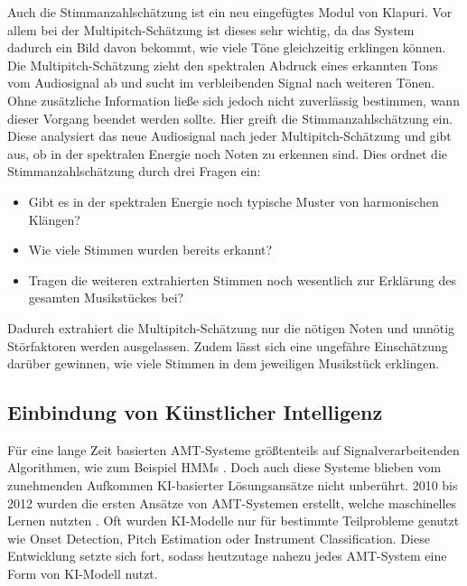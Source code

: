 \begin{description}[style=nextline]
\item[Multipitch-Schätzung]\label{itm:multi}
Auch die Stimmanzahlschätzung ist ein neu eingefügtes Modul von Klapuri.
Vor allem bei der Multipitch-Schätzung ist dieses sehr wichtig, da das System dadurch ein Bild davon bekommt,
wie viele Töne gleichzeitig erklingen können.
Die Multipitch-Schätzung zieht den spektralen Abdruck eines erkannten Tons vom Audiosignal ab und sucht im verbleibenden Signal nach weiteren Tönen.
Ohne zusätzliche Information ließe sich jedoch nicht zuverlässig bestimmen, wann dieser Vorgang beendet werden sollte.
Hier greift die Stimmanzahlschätzung ein.
Diese analysiert das neue Audiosignal nach jeder Multipitch-Schätzung und gibt aus,
ob in der spektralen Energie noch Noten zu erkennen sind.
Dies ordnet die Stimmanzahlschätzung durch drei Fragen ein:
\begin{itemize}
    \item Gibt es in der spektralen Energie noch typische Muster von harmonischen Klängen?
    \item Wie viele Stimmen wurden bereits erkannt?
    \item Tragen die weiteren extrahierten Stimmen noch wesentlich zur Erklärung des gesamten Musikstückes bei?
\end{itemize}
Dadurch extrahiert die Multipitch-Schätzung nur die nötigen Noten und unnötig Störfaktoren werden ausgelassen.
Zudem lässt sich eine ungefähre Einschätzung darüber gewinnen, wie viele Stimmen in dem jeweiligen Musikstück erklingen.
\end{description}

\subsection{Einbindung von Künstlicher Intelligenz}
Für eine lange Zeit basierten AMT-Systeme größtenteils auf Signalverarbeitenden Algorithmen,
wie zum Beispiel HMMs .
Doch auch diese Systeme blieben vom zunehmenden Aufkommen KI-basierter Lösungsansätze nicht unberührt.
2010 bis 2012 wurden die ersten Ansätze von AMT-Systemen erstellt, welche maschinelles Lernen nutzten \cite{eyben2010universal}.
Oft wurden KI-Modelle nur für bestimmte Teilprobleme genutzt
wie Onset Detection, Pitch Estimation oder Instrument Classification.
Diese Entwicklung setzte sich fort, sodass heutzutage nahezu jedes AMT-System eine Form von KI-Modell nutzt.

